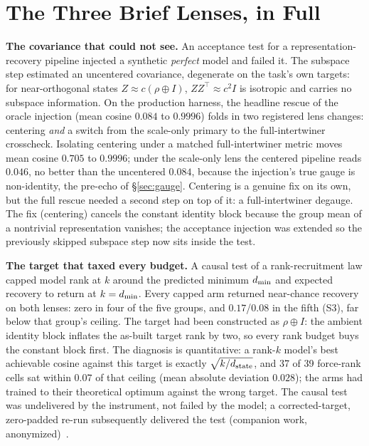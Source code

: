 \section{The Three Brief Lenses, in Full}
\label{app:threelenses}

\textbf{The covariance that could not see.} An acceptance test for a
representation-recovery pipeline injected a synthetic \emph{perfect}
model and failed it. The subspace step estimated an uncentered
covariance, degenerate on the task's own targets: for near-orthogonal
states $Z\approx c(\rho\oplus I)$, $ZZ^{\top}\approx c^{2}I$ is
isotropic and carries no subspace information. On the production
harness, the headline rescue of the oracle injection (mean cosine
$0.084$ to $0.9996$) folds in two registered lens changes: centering
\emph{and} a switch from the scale-only primary to the
full-intertwiner crosscheck. Isolating centering under a matched
full-intertwiner metric moves mean cosine $0.705$ to $0.9996$; under
the scale-only lens the centered pipeline reads $0.046$, no better
than the uncentered $0.084$, because the injection's true gauge is
non-identity, the pre-echo of \S\ref{sec:gauge}. Centering is a
genuine fix on its own, but the full rescue needed a second step on
top of it: a full-intertwiner degauge.
The fix (centering) cancels the constant identity block because the
group mean of a nontrivial representation vanishes; the acceptance
injection was extended so the previously skipped subspace step now
sits inside the test.

\textbf{The target that taxed every budget.} A causal test of a
rank-recruitment law capped model rank at $k$ around the predicted
minimum $d_{\min}$ and expected recovery to return at $k=d_{\min}$. Every
capped arm returned near-chance recovery on both lenses: zero in four
of the five groups, and $0.17$/$0.08$ in the fifth (S3), far below
that group's ceiling. The target
had been constructed as $\rho\oplus I$: the ambient identity block
inflates the as-built target rank by two, so every rank budget buys
the constant block first. The diagnosis is quantitative: a rank-$k$
model's best achievable cosine against this target is exactly
$\sqrt{k/d_{\mathrm{state}}}$, and 37 of 39 force-rank cells sat within $0.07$ of
that ceiling (mean absolute deviation $0.028$); the arms had trained
to their theoretical optimum against the wrong target.
The causal test was undelivered by the instrument, not failed by the
model; a corrected-target, zero-padded re-run subsequently delivered
the test (companion work, anonymized)~\citep{companion2026capacity}.

